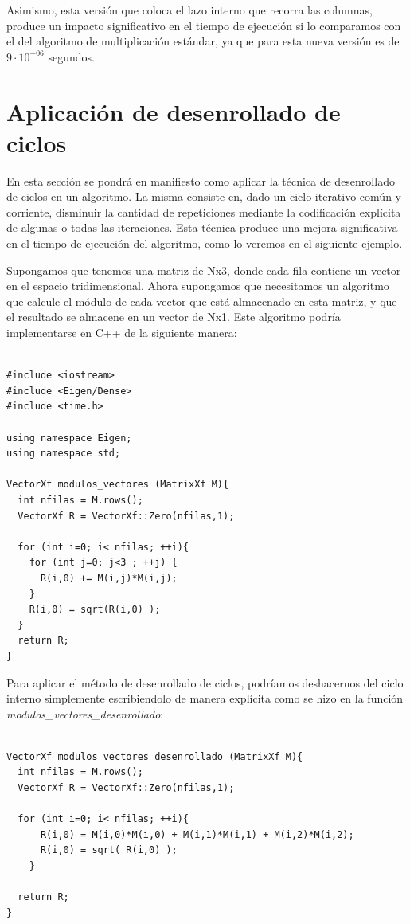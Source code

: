 Asimismo, esta versión que coloca el lazo interno que recorra las
columnas, produce un impacto significativo en el tiempo de ejecución
si lo comparamos con el del algoritmo de multiplicación estándar, ya que
para esta nueva versión es de $9\cdot10^{-06}$ segundos.

\section{Aplicación de desenrollado de ciclos}
\label{sec:desenrollado}

En esta sección se pondrá en manifiesto como aplicar la técnica de
desenrollado de ciclos en un algoritmo. La misma consiste en, dado un
ciclo iterativo común y corriente, disminuir la cantidad de
repeticiones mediante la codificación explícita de algunas o todas las
iteraciones. Esta técnica produce una mejora significativa en el
tiempo de ejecución del algoritmo, como lo veremos en el siguiente
ejemplo.

Supongamos que tenemos una matriz de Nx3, donde cada fila contiene un
vector en el espacio tridimensional. Ahora supongamos que necesitamos
un algoritmo que calcule el módulo de cada vector que está almacenado
en esta matriz, y que el resultado se almacene en un vector de
Nx1. Este algoritmo podría implementarse en C++ de la siguiente
manera:

\lstset{language=C++, breaklines=true, basicstyle=\footnotesize}
\begin{lstlisting}[frame=single]

#include <iostream>
#include <Eigen/Dense>
#include <time.h>

using namespace Eigen;
using namespace std;

VectorXf modulos_vectores (MatrixXf M){
  int nfilas = M.rows();
  VectorXf R = VectorXf::Zero(nfilas,1);
  
  for (int i=0; i< nfilas; ++i){
    for (int j=0; j<3 ; ++j) {
      R(i,0) += M(i,j)*M(i,j);
    }
    R(i,0) = sqrt(R(i,0) );
  }
  return R;
}

\end{lstlisting}
 
Para aplicar el método de desenrollado de ciclos, podríamos
deshacernos del ciclo interno simplemente escribiendolo de manera
explícita como se hizo en la función
\emph{modulos\_vectores\_desenrollado}:

\lstset{language=C++, breaklines=true, basicstyle=\footnotesize}
\begin{lstlisting}[frame=single]

VectorXf modulos_vectores_desenrollado (MatrixXf M){
  int nfilas = M.rows();
  VectorXf R = VectorXf::Zero(nfilas,1);
  
  for (int i=0; i< nfilas; ++i){
      R(i,0) = M(i,0)*M(i,0) + M(i,1)*M(i,1) + M(i,2)*M(i,2);
      R(i,0) = sqrt( R(i,0) );
    }

  return R;
}

\end{lstlisting}

